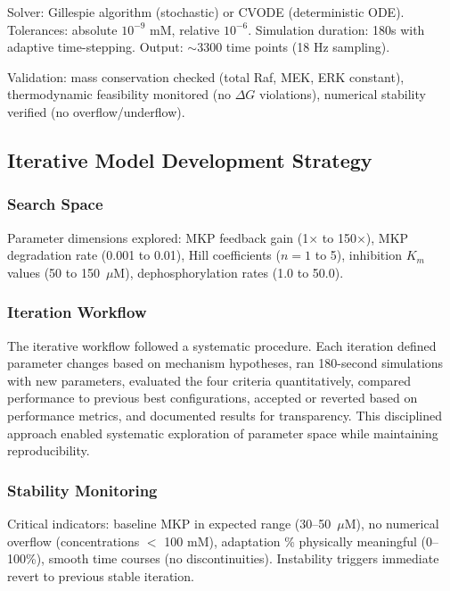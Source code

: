 \documentclass[twocolumn,11pt]{article}
\newcommand{\erk}{ERK}
\newcommand{\mkp}{MKP}
\newcommand{\dg}{\Delta G}
\begin{document}
Solver: Gillespie algorithm (stochastic) or CVODE (deterministic ODE). Tolerances: absolute $10^{-9}$ mM, relative $10^{-6}$. Simulation duration: 180s with adaptive time-stepping. Output: $\sim$3300 time points (18 Hz sampling).

Validation: mass conservation checked (total Raf, MEK, \erk{} constant), thermodynamic feasibility monitored (no $\dg{}$ violations), numerical stability verified (no overflow/underflow).

\subsection{Iterative Model Development Strategy}

\subsubsection{Search Space}

Parameter dimensions explored: \mkp{} feedback gain (1$\times$ to 150$\times$), \mkp{} degradation rate (0.001 to 0.01), Hill coefficients ($n = 1$ to 5), inhibition $K_m$ values (50 to 150~$\mu$M), dephosphorylation rates (1.0 to 50.0).

\subsubsection{Iteration Workflow}

The iterative workflow followed a systematic procedure. Each iteration defined parameter changes based on mechanism hypotheses, ran 180-second simulations with new parameters, evaluated the four criteria quantitatively, compared performance to previous best configurations, accepted or reverted based on performance metrics, and documented results for transparency. This disciplined approach enabled systematic exploration of parameter space while maintaining reproducibility.

\subsubsection{Stability Monitoring}

Critical indicators: baseline \mkp{} in expected range (30--50~$\mu$M), no numerical overflow (concentrations $<$ 100 mM), adaptation \% physically meaningful (0--100\%), smooth time courses (no discontinuities). Instability triggers immediate revert to previous stable iteration.

\end{document}
